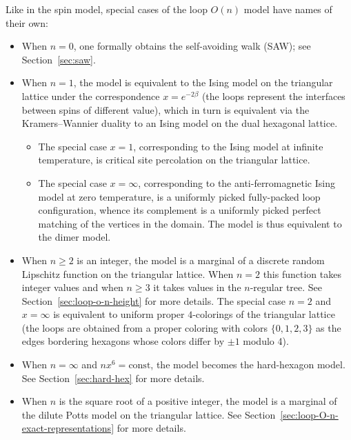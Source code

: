 \documentclass[12pt,reqno]{article}
\begin{document}
\bigbreak
Like in the spin model, special cases of the loop $O(n)$ model have names of their own:
\begin{itemize}[noitemsep,topsep=0.5em]
\setlength\itemsep{0.25em}
\item
When $n=0$, one formally obtains the self-avoiding walk (SAW); see Section~\ref{sec:saw}.

\item
When $n=1$, the model is equivalent to the Ising model on the triangular lattice under the correspondence $x = e^{-2\beta}$ (the loops represent the interfaces between spins of different value), which in turn is equivalent via the Kramers--Wannier duality \cite{KraWan41} to an Ising model on the dual hexagonal lattice.
\begin{itemize}[label=$\circ$]	
  \item The special case $x=1$, corresponding to the Ising model at infinite temperature, is critical site percolation on the triangular lattice.
  \item The special case $x=\infty$, corresponding to the anti-ferromagnetic Ising model at zero temperature, is a uniformly picked fully-packed loop configuration, whence its complement is a uniformly picked perfect matching of the vertices in the domain. The model is thus equivalent to the dimer model.
\end{itemize}

\item
When $n \ge 2$ is an integer, the model is a marginal of a discrete random Lipschitz function on the triangular lattice. When $n=2$ this function takes integer values and when $n \ge 3$ it takes values in the $n$-regular tree. See Section~\ref{sec:loop-o-n-height} for more details.
The special case $n=2$ and $x=\infty$ is equivalent to uniform proper $4$-colorings of the triangular lattice~\cite{baxter1970colorings} (the loops are obtained from a proper coloring with colors $\{0,1,2,3\}$ as the edges bordering hexagons whose colors differ by $\pm 1$ modulo 4).

\item
When $n=\infty$ and $nx^6 = \text{const}$, the model becomes the hard-hexagon model. See Section~\ref{sec:hard-hex} for more details.

\item When $n$ is the square root of a positive integer, the model is a marginal of the dilute Potts model on the triangular lattice. See Section~\ref{sec:loop-O-n-exact-representations} for more details.

\end{itemize}
\end{document}
